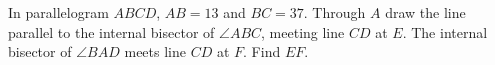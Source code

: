In parallelogram $ABCD$, $AB=13$ and $BC=37$. Through $A$ draw the line parallel to the internal bisector of $\angle ABC$, meeting line $CD$ at $E$. The internal bisector of $\angle BAD$ meets line $CD$ at $F$. Find $EF$.

